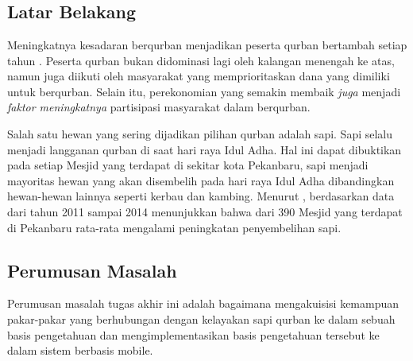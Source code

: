 %
%
%
%

\chapter{\babSatu}

\section{Latar Belakang}
Meningkatnya kesadaran berqurban menjadikan peserta qurban bertambah setiap tahun \cite{mangalagowri2016eeg}. Peserta qurban bukan didominasi lagi oleh kalangan menengah ke atas, namun juga diikuti oleh masyarakat yang memprioritaskan dana yang dimiliki untuk berqurban. Selain itu, perekonomian yang semakin membaik \textit{juga} menjadi \textit{faktor meningkatnya} partisipasi masyarakat dalam berqurban.

Salah satu hewan yang sering dijadikan pilihan qurban adalah sapi. Sapi selalu menjadi langganan qurban di saat hari raya Idul Adha. Hal ini dapat dibuktikan pada setiap Mesjid yang terdapat di sekitar kota Pekanbaru, sapi menjadi mayoritas hewan yang akan disembelih pada hari raya Idul Adha dibandingkan hewan-hewan lainnya seperti kerbau dan kambing. Menurut , berdasarkan data dari tahun 2011 sampai 2014 menunjukkan bahwa dari 390 Mesjid yang terdapat di Pekanbaru rata-rata mengalami peningkatan penyembelihan sapi.


\section{Perumusan Masalah}
Perumusan masalah tugas akhir ini adalah bagaimana mengakuisisi kemampuan pakar-pakar yang berhubungan dengan kelayakan sapi qurban ke dalam sebuah basis pengetahuan dan mengimplementasikan basis pengetahuan tersebut ke dalam sistem berbasis mobile.


